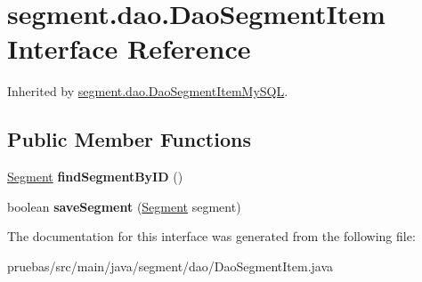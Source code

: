 \hypertarget{interfacesegment_1_1dao_1_1_dao_segment_item}{}\section{segment.\+dao.\+Dao\+Segment\+Item Interface Reference}
\label{interfacesegment_1_1dao_1_1_dao_segment_item}


Inherited by \mbox{\hyperlink{classsegment_1_1dao_1_1_dao_segment_item_my_s_q_l}{segment.\+dao.\+Dao\+Segment\+Item\+My\+S\+QL}}.

\subsection*{Public Member Functions}
\begin{DoxyCompactItemize}
\item 
\mbox{\label{interfacesegment_1_1dao_1_1_dao_segment_item_ab347059b047c0c014ca50b38055673a5}} 
\mbox{\hyperlink{classclases_1_1_segment}{Segment}} {\bfseries find\+Segment\+By\+ID} ()
\item 
\mbox{\label{interfacesegment_1_1dao_1_1_dao_segment_item_a1535dcb8477f7ab96c81041d8c86ba35}} 
boolean {\bfseries save\+Segment} (\mbox{\hyperlink{classclases_1_1_segment}{Segment}} segment)
\end{DoxyCompactItemize}


The documentation for this interface was generated from the following file\+:\begin{DoxyCompactItemize}
\item 
pruebas/src/main/java/segment/dao/Dao\+Segment\+Item.\+java\end{DoxyCompactItemize}
